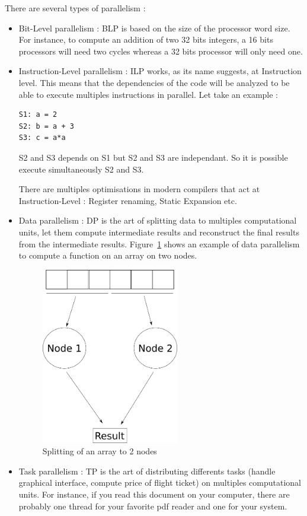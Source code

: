 There are several types of parallelism :
\begin{itemize}
\item Bit-Level parallelism : BLP is based on the size of the processor word size. For instance, to compute an addition of two 32 bits integers, a 16 bits processors will need two cycles whereas a 32 bits processor will only need one.
\item Instruction-Level parallelism : ILP works, as its name suggests, at Instruction level. This means that the dependencies of the code will be analyzed to be able to execute multiples instructions in parallel. Let take an example :
\begin{lstlisting}[frame=single]
S1: a = 2
S2: b = a + 3
S3: c = a*a
\end{lstlisting}
S2 and S3 depends on S1 but S2 and S3 are independant. So it is possible execute simultaneously S2 and S3.

There are multiples optimisations in modern compilers that act at Instruction-Level : Register renaming, Static Expansion etc.
\item Data parallelism : DP is the art of splitting data to multiples computational units, let them compute intermediate results and reconstruct the final results from the intermediate results. Figure~\ref{fig:Data_Parallelism} shows an example of data parallelism to compute a function on an array on two nodes.
\begin{figure}
\centering
\includegraphics[width=6cm]{gfx/Parallelism/Data_Parallelism.png}
\caption{Splitting of an array to 2 nodes}
\label{fig:Data_Parallelism}
\end{figure}
\item Task parallelism : TP is the art of distributing differents tasks (handle graphical interface, compute price of flight ticket) on multiples computational units. For instance, if you read this document on your computer, there are probably one thread for your favorite pdf reader and one for your system. 
\end{itemize}

